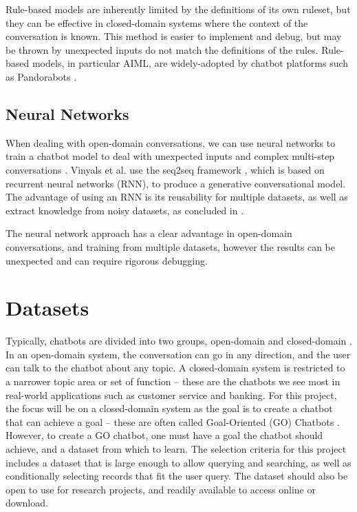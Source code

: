 Rule-based models are inherently limited by the definitions of its own ruleset, but they can be effective in closed-domain systems where the context of the conversation is known. This method is easier to implement and debug, but may be thrown by unexpected inputs do not match the definitions of the rules. Rule-based models, in particular AIML, are widely-adopted by chatbot platforms such as Pandorabots \cite{pandorabots2019about}.

\subsection{Neural Networks}
When dealing with open-domain conversations, we can use neural networks to train a chatbot model to deal with unexpected inputs and complex multi-step conversations \cite{vinyals2015neural}. Vinyals et al. use the seq2seq framework \cite{sutskever2014sequence}, which is based on recurrent neural networks (RNN), to produce a generative conversational model. The advantage of using an RNN is its reusability for multiple datasets, as well as extract knowledge from noisy datasets, as concluded in \cite{vinyals2015neural}.


The neural network approach has a clear advantage in open-domain conversations, and training from multiple datasets, however the results can be unexpected and can require rigorous debugging.

\newpage
\section{Datasets}
Typically, chatbots are divided into two groups, open-domain and closed-domain \cite{ilievski2018building}. In an open-domain system, the conversation can go in any direction, and the user can talk to the chatbot about any topic. A closed-domain system is restricted to a narrower topic area or set of function – these are the chatbots we see most in real-world applications such as customer service and banking. For this project, the focus will be on a closed-domain system as the goal is to create a chatbot that can achieve a goal – these are often called Goal-Oriented (GO) Chatbots \cite{ilievski2018building}. However, to create a GO chatbot, one must have a goal the chatbot should achieve, and a dataset from which to learn. The selection criteria for this project includes a dataset that is large enough to allow querying and searching, as well as conditionally selecting records that fit the user query. The dataset should also be open to use for research projects, and readily available to access online or download.


